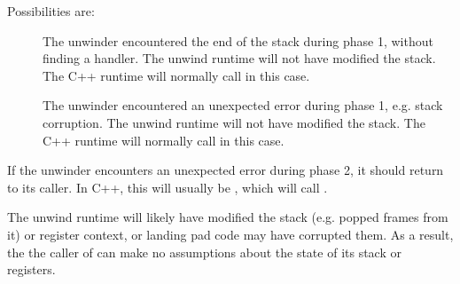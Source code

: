 Possibilities are:
\begin{description}
\item[]
\begin{sloppypar}
    The unwinder encountered the end of the
   stack during phase 1, without finding a handler. The unwind runtime
   will not have modified the stack. The C++ runtime will normally call
    in this case.
\end{sloppypar}
\item[] The unwinder encountered an unexpected
   error during phase 1, e.g. stack corruption. The unwind runtime will
   not have modified the stack. The C++ runtime will normally call
    in this case.
\end{description}

If the unwinder encounters an unexpected error during phase 2, it
should return  to its caller.  In
C++, this will usually be , which will call
.

The unwind runtime will likely have modified the stack (e.g. popped
frames from it) or register context, or landing pad code may have
corrupted them. As a result, the the caller of 
can make no assumptions about the state of its stack or registers.

\subsubsection{}



